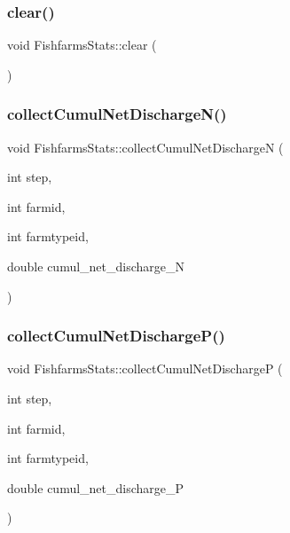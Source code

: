 \mbox{\label{class_fishfarms_stats_a2d5a843e50cf3c3908eb52806f887706}} 
\subsubsection{\texorpdfstring{clear()}{clear()}}
{\footnotesize\ttfamily void Fishfarms\+Stats\+::clear (\begin{DoxyParamCaption}{ }\end{DoxyParamCaption})}

\mbox{\label{class_fishfarms_stats_aa6863500cdc18119208fce87ca0f17a0}} 
\subsubsection{\texorpdfstring{collectCumulNetDischargeN()}{collectCumulNetDischargeN()}}
{\footnotesize\ttfamily void Fishfarms\+Stats\+::collect\+Cumul\+Net\+DischargeN (\begin{DoxyParamCaption}\item[{int}]{step,  }\item[{int}]{farmid,  }\item[{int}]{farmtypeid,  }\item[{double}]{cumul\+\_\+net\+\_\+discharge\+\_\+N }\end{DoxyParamCaption})}

\mbox{\label{class_fishfarms_stats_ad224fc2ef86d60de8e36d98f220a04d5}} 
\subsubsection{\texorpdfstring{collectCumulNetDischargeP()}{collectCumulNetDischargeP()}}
{\footnotesize\ttfamily void Fishfarms\+Stats\+::collect\+Cumul\+Net\+DischargeP (\begin{DoxyParamCaption}\item[{int}]{step,  }\item[{int}]{farmid,  }\item[{int}]{farmtypeid,  }\item[{double}]{cumul\+\_\+net\+\_\+discharge\+\_\+P }\end{DoxyParamCaption})}

